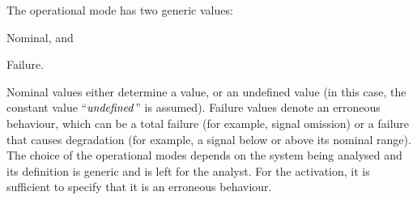 The operational mode has two generic values: 
\begin{alineasinline}
  \item Nominal, and 
  \item Failure.
\end{alineasinline}
Nominal values either determine a value, or an undefined value (in this case, the constant value ``$\mathit{undefined}$'' is assumed).
Failure values denote an erroneous behaviour, which can be a total failure (for example, signal omission) or a failure that causes degradation (for example, a signal below or above its nominal range).
The choice of the operational modes depends on the system being analysed and its definition is generic and is left for the analyst.
For the \ac{activation}, it is sufficient to specify that it is an erroneous behaviour.

